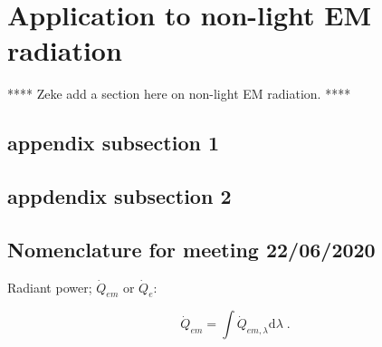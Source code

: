 
\section{Application to non-light EM radiation}
\label{sec:non_light}
  
**** Zeke add a section here on non-light EM radiation. ****





\subsection{appendix subsection 1}
\label{sec:appendix_subsection_1}
  


\subsection{appdendix subsection 2}
\label{sec:appendix_subsection_2}
  
\subsection{Nomenclature for meeting 22/06/2020}
  
Radiant power; $\dot{Q}_{em}$ or $\dot{Q}_e$:

\begin{equation}
  \dot{Q}_{em} = \int \dot{Q}_{em, \lambda} \mathrm{d}\lambda \; .
\end{equation}


